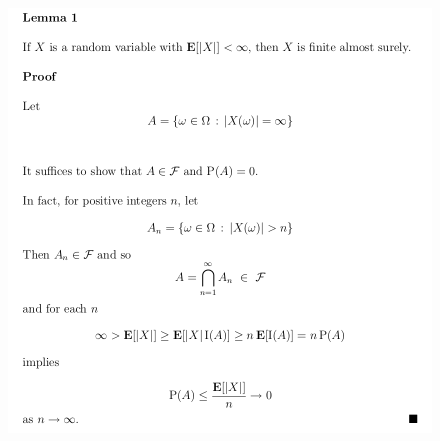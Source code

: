 \documentclass[c, dvipsnames, 8pt]{beamer}
\begin{document}
\begin{frame}[shrink=5]
	

	
	\frametitle{\insertsection} 
	\begin{figure}
		\centering
		\includegraphics[width=1\linewidth]{screenshot025}
		\label{fig:screenshot001}
	\end{figure}
	
	
\end{frame}
\end{document}
